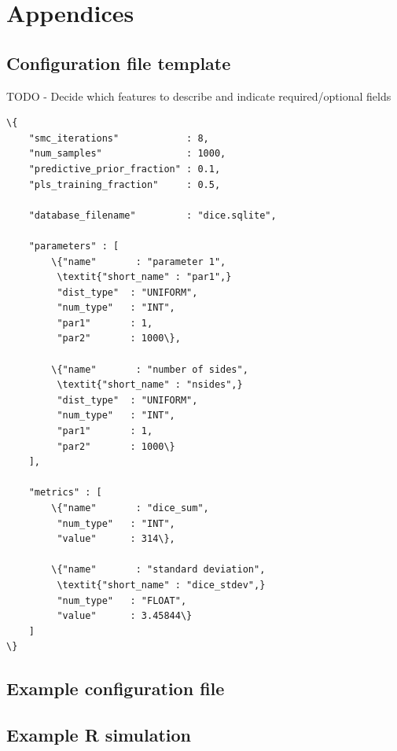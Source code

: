 \documentclass[a4paper,10pt]{article}
\begin{document}
\pagebreak
\appendix
\section*{Appendices}
\renewcommand{\thesubsection}{\Alph{subsection}}

\subsection{Configuration file template}
TODO - Decide which features to describe and indicate required/optional fields
\begin{Verbatim}[commandchars=\\\{\}]
\{
    "smc_iterations"            : 8,
    "num_samples"               : 1000,
    "predictive_prior_fraction" : 0.1,
    "pls_training_fraction"     : 0.5,

    "database_filename"         : "dice.sqlite",

    "parameters" : [
        \{"name"       : "parameter 1",
         \textit{"short_name" : "par1",}
         "dist_type"  : "UNIFORM",
         "num_type"   : "INT",
         "par1"       : 1,
         "par2"       : 1000\},

        \{"name"       : "number of sides",
         \textit{"short_name" : "nsides",}
         "dist_type"  : "UNIFORM",
         "num_type"   : "INT",
         "par1"       : 1,
         "par2"       : 1000\}
    ],

    "metrics" : [
        \{"name"       : "dice_sum",
         "num_type"   : "INT",
         "value"      : 314\},

        \{"name"       : "standard deviation",
         \textit{"short_name" : "dice_stdev",}
         "num_type"   : "FLOAT",
         "value"      : 3.45844\}
    ]
\}
\end{Verbatim}

\pagebreak

\subsection{Example configuration file}
\pagebreak

\subsection{Example R simulation}
\pagebreak
\end{document}
